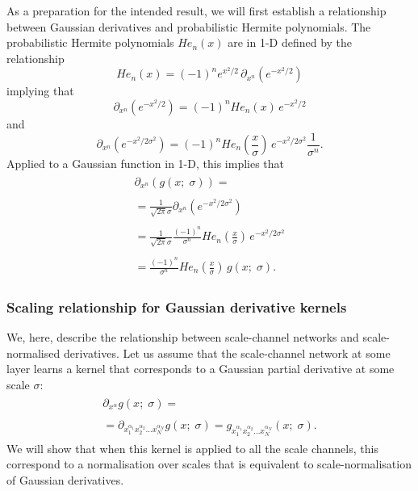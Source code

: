 \documentclass[twocolumn,runningheads]{svjour3}
\begin{document}
As a preparation for the intended result, we will first establish a
relationship between Gaussian derivatives and probabilistic Hermite
polynomials.
The probabilistic Hermite polynomials $H e_n(x)$ are in 1-D defined by the
relationship
\begin{equation}
H e_n(x) = (-1)^n e^{x^2/2} \, \partial_{x^n} \left( e^{-x^2/2} \right)
\end{equation}
implying that
\begin{equation}
\partial_{x^n} \left( e^{-x^2/2} \right) =  (-1)^n H e_n(x) \, e^{-x^2/2} 
\end{equation}
and 
\begin{equation}
\partial_{x^n} \left( e^{-x^2/2\sigma^2} \right) =  (-1)^n H e_n(\frac{x}{\sigma}) \, e^{-x^2/2\sigma^2} \frac{1}{\sigma^n}.
\end{equation}
Applied to a Gaussian function in 1-D, this implies that
\begin{align}
\begin{split}
\partial_{x^n} \left( g(x;\; \sigma) \right) =
\end{split}\nonumber\\
\begin{split}
= \frac{1}{\sqrt{2 \pi} \sigma} \partial_{x^n} \left( e^{-x^2/2\sigma^2} \right) 
\end{split}\nonumber\\
\begin{split}
= \frac{1}{\sqrt{2 \pi} \sigma}  \frac{(-1)^n}{\sigma^n}  H e_n(\frac{x}{\sigma}) \, e^{-x^2/2\sigma^2}
\end{split}\nonumber\\
\begin{split}
\label{eq-gauss-der-herm-pol}
= \frac{(-1)^n}{\sigma^n} H e_n(\frac{x}{\sigma}) \, g(x;\; \sigma).
\end{split}
\end{align}

\subsubsection{Scaling relationship for Gaussian derivative kernels}
\label{sec:relation-to-scale-space2}

We, here, describe the relationship between scale-channel networks and
scale-normalised derivatives. Let us assume that the scale-channel network at some layer learns a kernel that corresponds to a Gaussian partial derivative at
some scale $\sigma$:
\begin{align}
\begin{split}
\partial_{x^{\alpha}} g(x;\; \sigma) =
\end{split}\nonumber\\
\begin{split}
= \partial_{x_1^{\alpha_1} x_2^{\alpha_2} \dots x_N^{\alpha_N}}
g(x;\; \sigma) 
= g_{x_1^{\alpha_1} x_2^{\alpha_2} \dots x_N^{\alpha_N}}(x;\; \sigma).
\end{split}
\end{align}
We will show that when this kernel is applied to all the scale
channels, this correspond to a normalisation over scales that is equivalent to scale-normalisation of Gaussian derivatives. 
\end{document}
